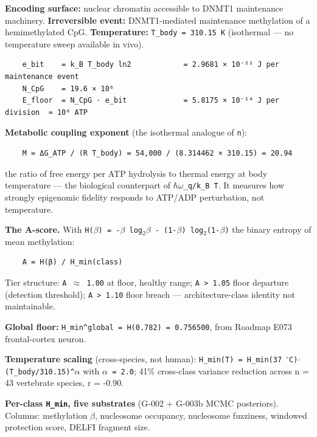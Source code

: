 \documentclass[12pt,a4paper]{article}
\begin{document}
\textbf{Encoding surface:} nuclear chromatin accessible to DNMT1 maintenance machinery. \textbf{Irreversible event:} DNMT1-mediated maintenance methylation of a hemimethylated CpG. \textbf{Temperature:} \texttt{T\_body = 310.15 K} (isothermal --- no temperature sweep available in vivo).


\begin{lstlisting}
    e_bit    = k_B T_body ln2            = 2.9681 × 10⁻²¹ J per maintenance event
    N_CpG    = 19.6 × 10⁶
    E_floor  = N_CpG · e_bit             = 5.8175 × 10⁻¹⁴ J per division  ≈ 10⁶ ATP
\end{lstlisting}


\textbf{Metabolic coupling exponent} (the isothermal analogue of \texttt{n}):


\begin{lstlisting}
    M = ΔG_ATP / (R T_body) = 54,000 / (8.314462 × 310.15) = 20.94
\end{lstlisting}


the ratio of free energy per ATP hydrolysis to thermal energy at body temperature --- the biological counterpart of \texttt{$\hbar\omega$\_q/k\_B T}. It measures how strongly epigenomic fidelity responds to ATP/ADP perturbation, not temperature.


\textbf{The A-score.} With \texttt{H($\beta$) = -$\beta$ log$_{2}\beta$ - (1-$\beta$) log$_{2}$(1-$\beta$)} the binary entropy of mean methylation:


\begin{lstlisting}
    A = H(β) / H_min(class)
\end{lstlisting}


Tier structure: \texttt{A $\approx$ 1.00} at floor, healthy range; \texttt{A > 1.05} floor departure (detection threshold); \texttt{A > 1.10} floor breach --- architecture-class identity not maintainable.


\textbf{Global floor:} \texttt{H\_min\textasciicircum{}global = H(0.782) = 0.756500}, from Roadmap E073 frontal-cortex neuron.


\textbf{Temperature scaling} (cross-species, not human): \texttt{H\_min(T) = H\_min(37 $^{\circ}$C)$\cdot$(T\_body/310.15)\textasciicircum{}$\alpha$} with \texttt{$\alpha$ = 2.0}; 41\% cross-class variance reduction across n = 43 vertebrate species, r = -0.90.


\textbf{Per-class \texttt{H\_min}, five substrates} (G-002 + G-003b MCMC posteriors). Columns: methylation $\beta$, nucleosome occupancy, nucleosome fuzziness, windowed protection score, DELFI fragment size.
\end{document}
